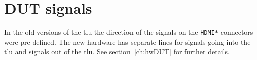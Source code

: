 \chapter{DUT signals}\label{ch:DUTsignals}
In the old versions of the \gls{tlu} the direction of the signals on the \verb|HDMI*| connectors were pre-defined. The new hardware has separate lines for signals going into the \gls{tlu} and signals out of the \gls{tlu}. See section~\ref{ch:hwDUT} for further details. \\ 